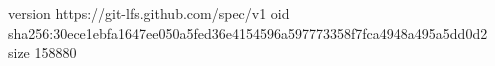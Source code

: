 version https://git-lfs.github.com/spec/v1
oid sha256:30ece1ebfa1647ee050a5fed36e4154596a597773358f7fca4948a495a5dd0d2
size 158880
